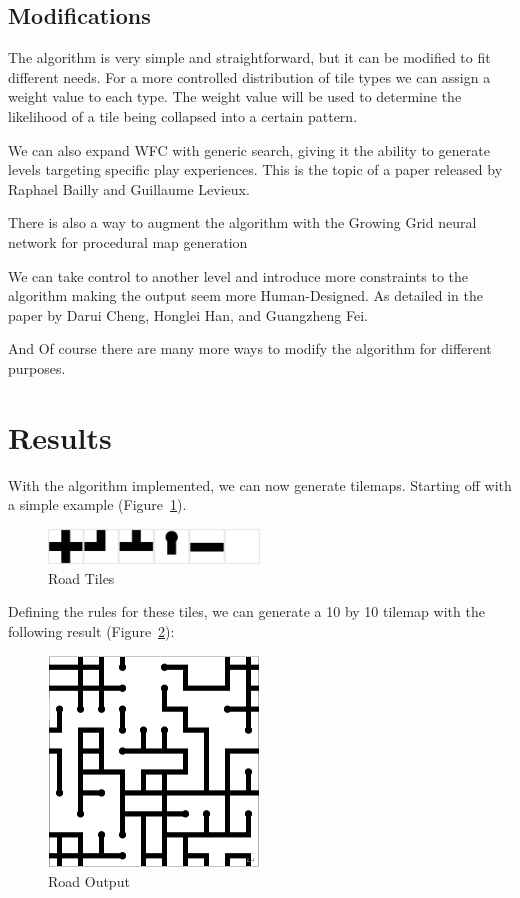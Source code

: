 \documentclass[10pt,oneside,a4paper]{article}
\begin{document}
\subsection{Modifications}\label{sec:modifications}
The algorithm is very simple and straightforward, but it can be modified to fit different needs.
For a more controlled distribution of tile types we can assign a weight value to each type.
The weight value will be used to determine the likelihood of a tile being collapsed into a certain pattern.

We can also expand WFC with generic search, giving it the ability to generate levels targeting specific play experiences.
This is the topic of a paper released by Raphael Bailly and Guillaume Levieux\cite{BL22}.

There is also a way to augment the algorithm with the Growing Grid neural network for procedural map generation~\cite{NMBP20}

We can take control to another level and introduce more constraints to the algorithm making the output seem more Human-Designed.
As detailed in the paper by Darui Cheng, Honglei Han, and Guangzheng Fei\cite{CHF20}.

And Of course there are many more ways to modify the algorithm for different purposes.

\section{Results}\label{sec:results}
With the algorithm implemented, we can now generate tilemaps.
Starting off with a simple example (Figure~\ref{fig:example1}).
\begin{figure}[h]
    \centering
    \includegraphics[width=0.5\textwidth]{figures/road_tiles.png}
    \caption{Road Tiles}\label{fig:example1}
\end{figure}

Defining the rules for these tiles, we can generate a 10 by 10 tilemap with the following result (Figure~\ref{fig:example1map}):

\begin{figure}[h]
    \centering
    \includegraphics[width=0.5\textwidth]{figures/roads_output.png}
    \caption{Road Output}\label{fig:example1map}
\end{figure}
\end{document}
